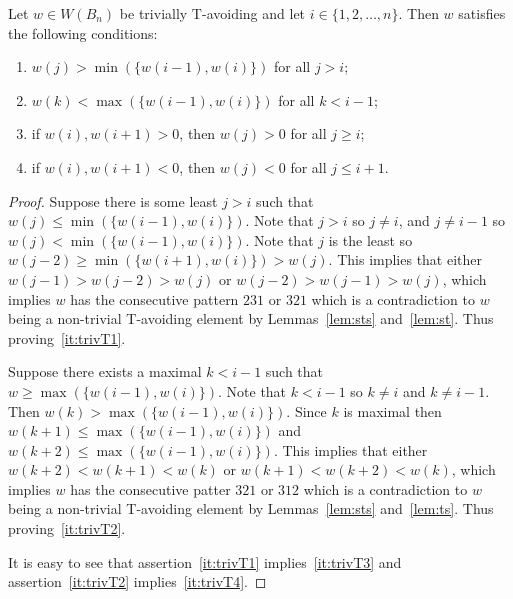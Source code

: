 \begin{lemma}
Let $w \in W(B_n)$ be trivially T-avoiding and let $i \in \{1,2, \ldots, n\}$. Then $w$ satisfies the following conditions:
\begin{enumerate}
\item $w(j) > \min(\{w(i-1), w(i)\})$ for all $j >i$;\label{it:trivT1}
\item $w(k) < \max(\{w(i-1), w(i)\})$ for all $k < i-1$;\label{it:trivT2}
\item if $w(i), w(i+1) > 0$, then $w(j)>0$ for all $j \geq i$;\label{it:trivT3}
\item if $w(i), w(i+1) < 0$, then $w(j)<0$ for all $j \leq i+1$.\label{it:trivT4}
\end{enumerate}
\begin{proof}
	Suppose there is some least $j>i$ such that $w(j) \leq \min(\{w(i-1), w(i)\})$. Note that $j>i$ so $j \neq i$, and $j \neq i-1$ so $w(j) < \min(\{w(i-1), w(i)\})$. Note that $j$ is the least so $w(j-2) \geq \min(\{w(i+1), w(i)\})>w(j)$. This implies that either $w(j-1)>w(j-2)>w(j)$ or $w(j-2)>w(j-1)>w(j)$, which implies $w$ has the consecutive pattern $231$ or $321$ which is a contradiction to $w$ being a non-trivial T-avoiding element by Lemmas~\ref{lem:sts} and~\ref{lem:st}. Thus proving~\ref{it:trivT1}.
	
	Suppose there exists a maximal $k<i-1$ such that $w \geq \max(\{w(i-1), w(i)\})$. Note that $k < i-1$ so $k \neq i$ and $k \neq i-1$. Then $w(k)> \max(\{w(i-1), w(i)\})$. Since $k$ is maximal then $w(k+1) \leq  \max(\{w(i-1), w(i)\})$ and $w(k+2) \leq \max(\{w(i-1), w(i)\})$. This implies that either $w(k+2)<w(k+1)<w(k)$ or $w(k+1)<w(k+2)<w(k)$, which implies $w$ has the consecutive patter $321$ or $312$ which is a contradiction to $w$ being a non-trivial T-avoiding element by Lemmas~\ref{lem:sts} and~\ref{lem:ts}. Thus proving~\ref{it:trivT2}.
	
	It is easy to see that assertion~\ref{it:trivT1} implies~\ref{it:trivT3} and assertion~\ref{it:trivT2} implies~\ref{it:trivT4}.
\end{proof}	
\end{lemma}

